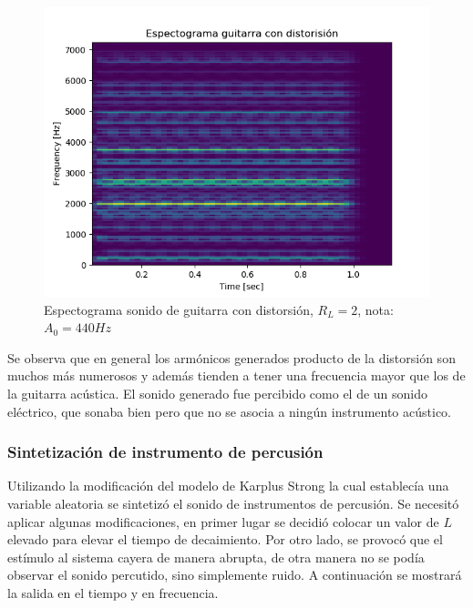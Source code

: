 \documentclass[assd_tp2_main.tex]{subfiles}
\begin{document}
\begin{figure}[H]
	\begin{center}
	\includegraphics[scale=0.5]{graficos/espectograma_guitarra_distorsion.png}
	\caption{Espectograma sonido de guitarra con distorsión, $R_L=2$, nota: $A_0=440 Hz$}

	\end{center}
\end{figure}
Se observa que en general los armónicos generados producto de la distorsión son muchos más numerosos y además tienden a tener una frecuencia mayor que los de la guitarra acústica. 
El sonido generado fue percibido como el de un sonido eléctrico, que sonaba bien pero que no se asocia a ningún instrumento acústico.
 
\subsubsection{Sintetización de instrumento de percusión}

Utilizando la modificación del modelo de Karplus Strong la cual establec\'ia una variable aleatoria se sintetiz\'o el sonido de instrumentos de percusión. Se necesit\'o aplicar algunas modificaciones, en primer lugar se decidió colocar un valor de $L$ elevado para elevar el tiempo de decaimiento. Por otro lado, se provocó que el est\'imulo al sistema cayera de manera abrupta, de otra manera no se podía observar el sonido percutido, sino simplemente ruido. A continuación se mostrará la salida en el tiempo y en frecuencia.
\end{document}
